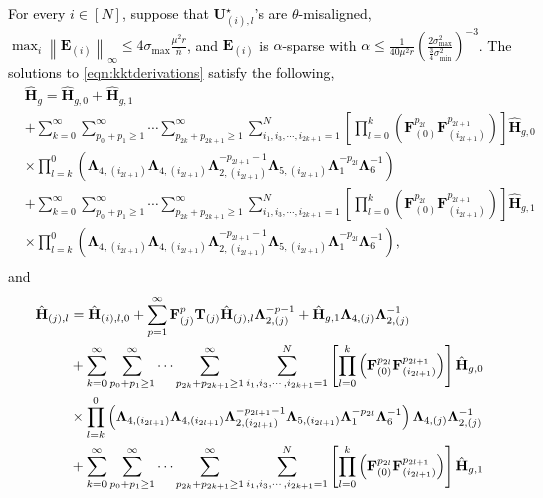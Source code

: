 \documentclass[twoside,11pt]{article}
\newcommand{\revise}[1]{\textcolor{black}{ #1}}
\newcommand{\norm}[1]{\left\lVert#1\right\rVert}
\newcommand{\matE}{\mathbf{E}}
\newcommand{\matF}{\mathbf{F}}
\newcommand{\hmatH}{{\hat{\mathbf{H}}}{}}
\newcommand{\matT}{\mathbf{T}}
\newcommand{\matLambda}{\mathbf{\Lambda}}
\newcommand{\matU}{\mathbf{U}}
\newcommand{\gop}{\sigma_{\max}}
\newcommand{\bn}{{\overline{n}}}
\newcommand{\sms}{\sigma_{\min}^2}
\newcommand{\brtkappa}{\left(\frac{2\gop^2}{\frac{3}{4}\sms}\right)}
\begin{document}
\revise{\begin{lemma}
\label{lm:explicitsolution}
For every $i\in [N]$, suppose that $\matU^\star_{(i),l}$'s are $\theta$-misaligned, $\max_i\norm{\matE_{(i)}}_{\infty}\le 4\gop\frac{\mu^2 r}{\bn}$, and $\matE_{(i)}$ is $\alpha$-sparse with $
 \alpha \le \frac{1}{40\mu^2 r}\brtkappa^{-3}$.
The solutions to \eqref{eqn:kktderivations} satisfy the following,
\begin{equation}
\label{eqn:ugcondition}
\begin{aligned}
&\hmatH_g=\hmatH_{g,0}+\hmatH_{g,1}\\
&+\sum_{k=0}^\infty\sum_{p_0+p_1\ge 1}^{\infty}\cdots\sum_{p_{2k}+p_{2k+1}\ge 1}^{\infty}\sum_{i_1,i_3,\cdots,i_{2k+1}=1}^N\left[\prod_{l=0}^{k}\left(\matF_{(0)}^{p_{2l}}\matF_{(i_{2l+1})}^{p_{2l+1}}\right)\right]\hmatH_{g,0}\\
&\times \prod_{l=k}^0\left(\matLambda_{4,(i_{2l+1})}\matLambda_{4,(i_{2l+1})}\matLambda_{2,(i_{2l+1})}^{-p_{2l+1}-1}\matLambda_{5,(i_{2l+1})}\matLambda_{1}^{-p_{2l}}\matLambda_6^{-1}\right)\\
&+\sum_{k=0}^\infty\sum_{p_0+p_1\ge 1}^{\infty}\cdots\sum_{p_{2k}+p_{2k+1}\ge 1}^{\infty}\sum_{i_1,i_3,\cdots,i_{2k+1}=1}^N\left[\prod_{l=0}^{k}\left(\matF_{(0)}^{p_{2l}}\matF_{(i_{2l+1})}^{p_{2l+1}}\right)\right]\hmatH_{g,1}\\
&\times \prod_{l=k}^0\left(\matLambda_{4,(i_{2l+1})}\matLambda_{4,(i_{2l+1})}\matLambda_{2,(i_{2l+1})}^{-p_{2l+1}-1}\matLambda_{5,(i_{2l+1})}\matLambda_{1}^{-p_{2l}}\matLambda_6^{-1}\right),\\
\end{aligned}
\end{equation}
and
\begin{align}
\hmatH_{(j),l}&=\hmatH_{(i),l,0}+\sum_{p=1}^{\infty}\matF_{(j)}^p\matT_{(j)}\hmatH_{(j),l}\matLambda_{2,(j)}^{-p-1}+\hmatH_{g,1}\matLambda_{4,(j)}\matLambda_{2,(j)}^{-1}\notag\\
&+\sum_{k=0}^\infty\sum_{p_0+p_1\ge 1}^{\infty}\cdots\sum_{p_{2k}+p_{2k+1}\ge 1}^{\infty}\sum_{i_1,i_3,\cdots,i_{2k+1}=1}^N\left[\prod_{l=0}^{k}\left(\matF_{(0)}^{p_{2l}}\matF_{(i_{2l+1})}^{p_{2l+1}}\right)\right]\hmatH_{g,0}\notag\\
&\times \prod_{l=k}^0\left(\matLambda_{4,(i_{2l+1})}\matLambda_{4,(i_{2l+1})}\matLambda_{2,(i_{2l+1})}^{-p_{2l+1}-1}\matLambda_{5,(i_{2l+1})}\matLambda_{1}^{-p_{2l}}\matLambda_6^{-1}\right)\matLambda_{4,(j)}\matLambda_{2,(j)}^{-1}\notag\\
&+\sum_{k=0}^\infty\sum_{p_0+p_1\ge 1}^{\infty}\cdots\sum_{p_{2k}+p_{2k+1}\ge 1}^{\infty}\sum_{i_1,i_3,\cdots,i_{2k+1}=1}^N\left[\prod_{l=0}^{k}\left(\matF_{(0)}^{p_{2l}}\matF_{(i_{2l+1})}^{p_{2l+1}}\right)\right]\hmatH_{g,1}\notag\\

\end{align}
\end{lemma}}
\end{document}
